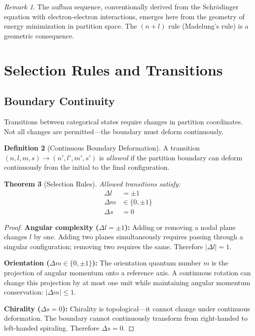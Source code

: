 \documentclass[twocolumn,10pt,a4paper]{article}
\newtheorem{theorem}{Theorem}[section]
\theoremstyle{definition}
\newtheorem{definition}[theorem]{Definition}
\theoremstyle{remark}
\newtheorem{remark}[theorem]{Remark}
\begin{document}
\begin{remark}
The aufbau sequence, conventionally derived from the Schr\"{o}dinger equation with electron-electron interactions, emerges here from the geometry of energy minimization in partition space. The $(n + l)$ rule (Madelung's rule) is a geometric consequence.
\end{remark}

\section{Selection Rules and Transitions}
\label{sec:transitions}

\subsection{Boundary Continuity}

Transitions between categorical states require changes in partition coordinates. Not all changes are permitted---the boundary must deform continuously.

\begin{definition}[Continuous Boundary Deformation]
A transition $(n, l, m, s) \to (n', l', m', s')$ is \emph{allowed} if the partition boundary can deform continuously from the initial to the final configuration.
\end{definition}

\begin{theorem}[Selection Rules]
\label{thm:selection_rules}
Allowed transitions satisfy:
\begin{align}
    \Delta l &= \pm 1 \\
    \Delta m &\in \{0, \pm 1\} \\
    \Delta s &= 0
\end{align}
\end{theorem}

\begin{proof}
\textbf{Angular complexity ($\Delta l = \pm 1$):}
Adding or removing a nodal plane changes $l$ by one. Adding two planes simultaneously requires passing through a singular configuration; removing two requires the same. Therefore $|\Delta l| = 1$.

\textbf{Orientation ($\Delta m \in \{0, \pm 1\}$):}
The orientation quantum number $m$ is the projection of angular momentum onto a reference axis. A continuous rotation can change this projection by at most one unit while maintaining angular momentum conservation: $|\Delta m| \leq 1$.

\textbf{Chirality ($\Delta s = 0$):}
Chirality is topological---it cannot change under continuous deformation. The boundary cannot continuously transform from right-handed to left-handed spiraling. Therefore $\Delta s = 0$.
\end{proof}
\end{document}
